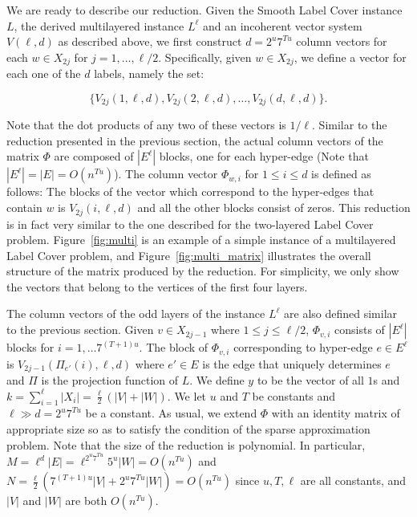 \documentclass[11pt]{article}
\begin{document}
We are ready to describe our reduction. Given the Smooth
Label Cover instance $L$, the derived multilayered instance
$L^{\ell}$ and an incoherent vector system $V(\ell,d)$ as
described above, we first construct $d=2^u7^{Tu}$ column
vectors for each $w \in X_{2j}$ for $j=1,\hdots,\ell/2$.
Specifically, given $w \in X_{2j}$, we define a vector for
each one of the $d$ labels, namely the set:

$$\{V_{2j}(1,\ell,d), V_{2j}(2,\ell,d), \hdots, V_{2j}(d,\ell,d)\}.$$

\noindent Note that the dot products of any two of these vectors is
$1/\ell$. Similar to the reduction presented in the previous
section, the actual column vectors of the matrix $\Phi$ are
composed of $|E^{\ell}|$ blocks, one for each hyper-edge
(Note that $|E^{\ell}| = |E| = O(n^{Tu})$). The column vector
$\Phi_{w,i}$ for $1 \leq i \leq d$ is defined as follows:
The blocks of the vector which correspond to the hyper-edges
that contain $w$ is $V_{2j}(i,\ell,d)$ and all the other
blocks consist of zeros. This reduction is in fact very similar
to the one described for the two-layered Label Cover problem.
Figure~\ref{fig:multi} is an example of
a simple instance of a multilayered Label Cover problem, and
Figure~\ref{fig:multi_matrix} illustrates the overall structure of
the matrix produced by the reduction. For simplicity, we
only show the vectors that belong to the vertices of the
first four layers.

The column vectors of the odd layers of the instance
$L^{\ell}$ are also defined similar to the previous section.
Given $v \in X_{2j-1}$ where $1 \leq j \leq \ell/2$, $\Phi_{v,i}$
consists of $|E^{\ell}|$ blocks for $i=1, \hdots 7^{(T+1)u}$.
The block of $\Phi_{v,i}$ corresponding to hyper-edge
$e \in E^{\ell}$ is $V_{2j-1}(\Pi_{e'}(i), \ell, d)$ where
$e' \in E$ is the edge that uniquely determines $e$ and $\Pi$
is the projection function of $L$. We define $y$ to be
the vector of all $1$s and $k=\sum_{i=1}^{\ell} |X_i| =
\frac{\ell}{2}(|V|+|W|)$. We
let $u$ and $T$ be constants and $\ell \gg d = 2^u 7^{Tu}$
be a constant. As usual, we extend $\Phi$ with an identity
matrix of appropriate size so as to satisfy the condition
of the sparse approximation problem. Note that the size of the
reduction is polynomial. In particular,
$M = \ell^d |E| = \ell^{2^u 7^{Tu}}5^u|W| = O(n^{Tu})$ and
$N = \frac{\ell}{2}(7^{(T+1)u}|V|+2^u7^{Tu}|W|) = O(n^{Tu})$ since
$u,T,\ell$ are all constants, and $|V|$ and $|W|$ are both $O(n^{Tu})$.
\end{document}
